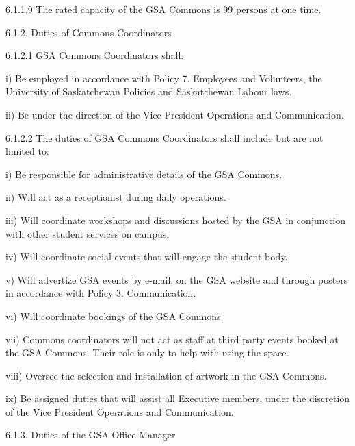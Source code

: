  6.1.1.9 The rated capacity of the GSA Commons is 99 persons at one time. 
 
 
 
 6.1.2. Duties of Commons Coordinators 
 
 
 
 6.1.2.1 GSA Commons Coordinators shall: 
 
 
 
 i) Be employed in accordance with Policy 7. Employees and 
 Volunteers, the University of Saskatchewan Policies and 
 Saskatchewan Labour laws. 
 
 
 
 ii) Be under the direction of the Vice President Operations and 
 Communication. 
 
 
 
 6.1.2.2 The duties of GSA Commons Coordinators shall include but are not 
 limited to: 
 
 
 
 i) Be responsible for administrative details of the GSA Commons. 
 
 
 
 ii) Will act as a receptionist during daily operations. 
 
 
 
 iii) Will coordinate workshops and discussions hosted by the GSA 
 in conjunction with other student services on campus. 
 
 
 
 iv) Will coordinate social events that will engage the student body. 
 

 v) Will advertize GSA events by e-mail, on the GSA website and 
 through posters in accordance with Policy 3. Communication. 
 
 
 
 vi) Will coordinate bookings of the GSA Commons. 
 
 
 
 vii) Commons coordinators will not act as staff at third party events 
 booked at the GSA Commons. Their role is only to help with 
 using the space. 
 
 
 
 viii) Oversee the selection and installation of artwork in the GSA 
 Commons. 
 
 
 
 ix) Be assigned duties that will assist all Executive members, under 
 the discretion of the Vice President Operations and 
 Communication. 
 
 
 
 6.1.3. Duties of the GSA Office Manager 
 
